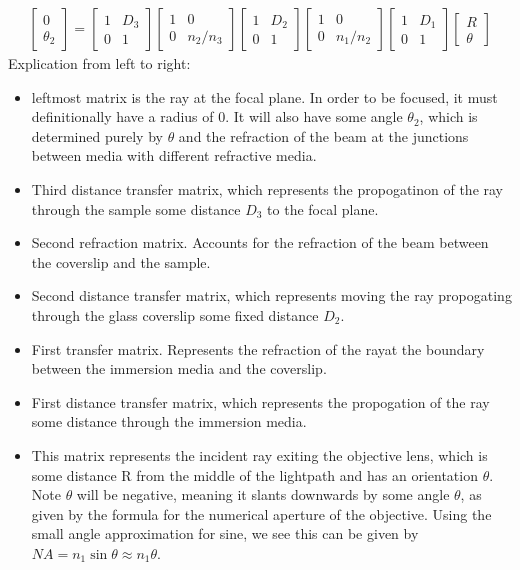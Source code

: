 \begin{gather}
    \begin{bmatrix}
        0 \\ \theta_2
    \end{bmatrix}
    = 
    \begin{bmatrix}
        1 & D_3\\ 0 & 1 
    \end{bmatrix}
    \begin{bmatrix}
        1 & 0\\ 0 & n_2/n_3 
    \end{bmatrix}
    \begin{bmatrix}
        1 & D_2\\ 0 & 1 
    \end{bmatrix}
    \begin{bmatrix}
        1 & 0\\ 0 & n_1/n_2 
    \end{bmatrix}
    \begin{bmatrix}
        1 & D_1\\ 0 & 1 
    \end{bmatrix}
    \begin{bmatrix}
        R \\ \theta
    \end{bmatrix}
\end{gather}
Explication from left to right:\\
\begin{itemize}
    \item leftmost matrix is the ray at the focal plane. In order to be focused, it must definitionally have a radius of 0. It will also have some angle $\theta_2$, which is determined purely by $\theta$ and the refraction of the beam at the junctions between media with different refractive media.
    \item Third distance transfer matrix, which represents the propogatinon of the ray through the sample some distance $D_3$ to the focal plane.
    \item Second refraction matrix. Accounts for the refraction of the beam between the coverslip and the sample.
    \item Second distance transfer matrix, which represents moving the ray propogating through the glass coverslip some fixed distance $D_2$.
    \item First transfer matrix. Represents the refraction of the rayat the boundary between the immersion media and the coverslip.
    \item First distance transfer matrix, which represents the propogation of the ray some distance through the immersion media.
    \item This matrix represents the incident ray exiting the objective lens, which is some distance R from the middle of the lightpath and has an orientation $\theta$. Note $\theta$ will be negative, meaning it slants downwards by some angle $\theta$, as given by the formula for the numerical aperture of the objective. Using the small angle approximation for sine, we see this can be given by $NA=n_1 \sin \theta \approx n_1 \theta$.
\end{itemize}
